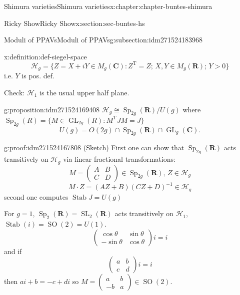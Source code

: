 \documentclass[oneside,10pt,]{book}
\numberwithin{equation}{section}
\newcommand{\inv}{^{-1}}
\newcommand{\RR}{\mathbf{R}}
\newcommand{\CC}{\mathbf{C}}
\newcommand{\transpose}{\mathrm{T}}
\DeclareMathOperator{\Stab}{Stab}
\DeclareMathOperator{\SL}{SL}
\DeclareMathOperator{\GL}{GL}
\DeclareMathOperator{\specialorthogonal}{SO}
\DeclareMathOperator{\Sp}{Sp}
\newcommand{\gt}{>}
\newcommand{\amp}{&}
\begin{document}
\begin{chapterptx}{Shimura varieties}{}{Shimura varieties}{}{}{x:chapter:chapter-buntes-shimura}
\begin{sectionptx}{Ricky Show}{}{Ricky Show}{}{}{x:section:sec-buntes-hs}
\begin{subsectionptx}{Moduli of PPAVs}{}{Moduli of PPAVs}{}{}{g:subsection:idm271524183968}
\begin{definition}{}{x:definition:def-siegel-space}
\begin{equation*}
\mathscr H_g = \{ Z = X+iY \in M_g(\CC) : Z^\transpose  = Z ; \, X,Y \in M_g(\RR); \, Y \gt 0\}
\end{equation*}
i.e. \(Y\) is pos. def.%
\end{definition}
Check: \(\mathscr H_1\) is the usual upper half plane.%
\begin{proposition}{}{}{g:proposition:idm271524169408}%
\(\mathscr H_g \cong \Sp_{2g}(\RR)/U(g)\) where \(\Sp_{2g} (R) = \{ M \in \GL_{2g}(R) : M^\transpose J M = J\}\)%
\begin{equation*}
U(g) = O(2g) \cap \Sp_{2g}(\RR) \cap \GL_{g}(\CC)\text{.}
\end{equation*}
%
\end{proposition}
\begin{proofptx}{}{g:proof:idm271524167808}
(Sketch) First one can show that \(\Sp_{2g}(\RR)\) acts transitively on \(\mathscr H_g\) via linear fractional transformations:%
\begin{equation*}
M = \begin{pmatrix} A\amp B\\ C\amp D\end{pmatrix} \in \Sp_{2g}(\RR),\, Z\in \mathscr H_g
\end{equation*}
%
\begin{equation*}
M\cdot Z = (AZ+B)(CZ+D)\inv \in \mathscr H_g
\end{equation*}
second one computes \(\Stab J = U(g)\)%
\par
For \(g= 1\), \(\Sp_2(\RR) = \SL_2(\RR)\) acts transitively on \(\mathscr H_1\), \(\Stab(i) = \specialorthogonal (2) = U(1)\).%
\begin{equation*}
\begin{pmatrix} \cos \theta\amp \sin \theta \\ - \sin \theta \amp \cos \theta \end{pmatrix} i = i
\end{equation*}
and if%
\begin{equation*}
\begin{pmatrix} a \amp b \\ c \amp d\end{pmatrix} i = i
\end{equation*}
then \(ai + b = -c + di\) so \(M= \begin{pmatrix} a\amp b\\ -b \amp a \end{pmatrix}\in \specialorthogonal(2)\).%
\end{proofptx}

\end{subsectionptx}
\end{sectionptx}
\end{chapterptx}
\end{document}

